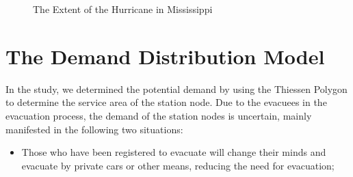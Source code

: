 \documentclass{mcmthesis}	%
\begin{document}
\begin{figure}[tbp]%
  \caption{The Extent of the Hurricane in Mississippi}\label{figure1}
\end{figure}

\section{The Demand Distribution Model}


In the study, we determined the potential demand by using the Thiessen Polygon to determine the service area of the station node. Due to the evacuees in the evacuation process, the demand of the station nodes is uncertain, mainly manifested in the following two situations:

\begin{itemize}

\item Those who have been registered to evacuate will change their minds and evacuate by private cars or other means, reducing the need for evacuation;

\end{itemize}

\end{document}
